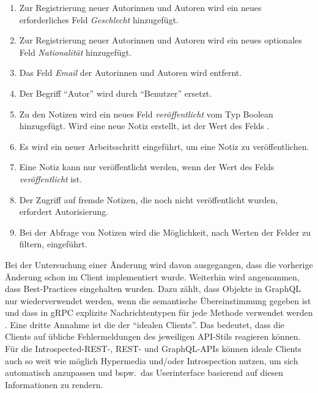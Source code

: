 \begin{enumerate}[label=\textbf{C\arabic*}]
    \item\label{itm:data-collection|evolvability|add-mandatory-form-field} Zur Registrierung neuer Autorinnen und Autoren wird ein neues erforderliches Feld \textit{Geschlecht} hinzugefügt.
    \item\label{itm:data-collection|evolvability|add-optional-form-field} Zur Registrierung neuer Autorinnen und Autoren wird ein neues optionales Feld \textit{Nationalität} hinzugefügt.
    \item\label{itm:data-collection|evolvability|remove-mandatory-field} Das Feld \textit{Email} der Autorinnen und Autoren wird entfernt.
    \item\label{itm:data-collection|evolvability|rename} Der Begriff \enquote{Autor} wird durch \enquote{Benutzer} ersetzt.
    \item\label{itm:data-collection|evolvability|add-non-nullable-field} Zu den Notizen wird ein neues Feld \textit{veröffentlicht} vom Typ Boolean hinzugefügt. Wird eine neue Notiz erstellt, ist der Wert des Felds .
    \item\label{itm:data-collection|evolvability|add-publish-step} Es wird ein neuer Arbeitsschritt eingeführt, um eine Notiz zu veröffentlichen.
    \item\label{itm:data-collection|evolvability|constrain-publish-step} Eine Notiz kann nur veröffentlicht werden, wenn der Wert des Felds \textit{veröffentlicht}  ist.
    \item\label{itm:data-collection|evolvability|require-auth} Der Zugriff auf fremde Notizen, die noch nicht veröffentlicht wurden, erfordert Autorisierung.
    \item\label{itm:data-collection|evolvability|new-capability} Bei der Abfrage von Notizen wird die Möglichkeit, nach Werten der Felder zu filtern, eingeführt.
\end{enumerate}
Bei der Untersuchung einer Änderung wird davon ausgegangen, dass die vorherige Änderung schon im Client implementiert wurde. Weiterhin wird angenommen, dass Best-Practices eingehalten wurden. Dazu zählt, dass Objekte in GraphQL nur wiederverwendet werden, wenn die semantische Übereinstimmung gegeben ist \autocite[S.~53ff.]{Giroux2020} und dass in gRPC explizite Nachrichtentypen für jede Methode verwendet werden \autocite[07:29--08:25]{Michela2020}. Eine dritte Annahme ist die der \enquote{idealen Clients}. Das bedeutet, dass die Clients auf übliche Fehlermeldungen des jeweiligen API-Stils reagieren können. Für die Introspected-REST-, REST- und GraphQL-APIs können ideale Clients auch so weit wie möglich Hypermedia und/oder Introspection nutzen, um sich automatisch anzupassen und bspw.\ das Userinterface basierend auf diesen Informationen zu rendern.

